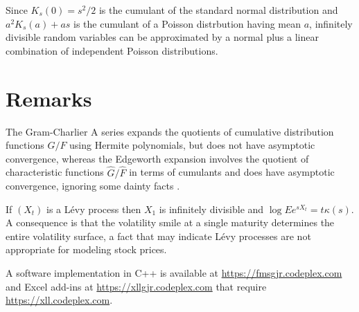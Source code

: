 \documentclass[11pt]{article}
\theoremstyle{definition}
\begin{document}
Since \(K_s(0) = s^2/2\) is the cumulant of the standard normal
distribution and \(a^2K_s(a) + as\) is the cumulant of a
Poisson distrbution having mean \(a\),
infinitely divisible random variables can be
approximated by a normal plus a linear combination of
independent Poisson distributions.

%

\section{Remarks}
The Gram-Charlier A series expands the quotients of cumulative
distribution functions \(G/F\) using Hermite polynomials, but does not
have asymptotic convergence, whereas the Edgeworth expansion involves
the quotient of characteristic functions \(\hat G/\hat F\) in terms of
cumulants and does have asymptotic convergence, ignoring some dainty
facts \cite{Pet1975}.

If \((X_t)\) is a L\'evy process then \(X_1\) is
infinitely divisible and \(\log Ee^{sX_t} = t\kappa(s)\).
A consequence is that the volatility smile at a single
maturity determines the entire volatility surface, a fact that
may indicate L\'evy processes are not appropriate for
modeling stock prices.

A software implementation in C++ is available at
\url{https://fmsgjr.codeplex.com} and Excel add-ins
at \url{https://xllgjr.codeplex.com} that require
\url{https://xll.codeplex.com}.



\end{document}
